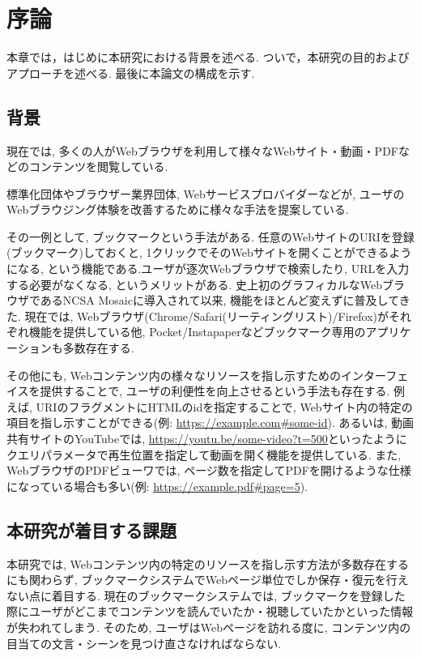 \chapter{序論}
\label{chap:introduction}

本章では，はじめに本研究における背景を述べる.
ついで，本研究の目的およびアプローチを述べる.
最後に本論文の構成を示す.

\section{背景}
\label{section:background}

現在では, 多くの人がWebブラウザを利用して様々なWebサイト・動画・PDFなどのコンテンツを閲覧している.

標準化団体やブラウザー業界団体, Webサービスプロバイダーなどが, ユーザのWebブラウジング体験を改善するために様々な手法を提案している.

その一例として, ブックマークという手法がある.
任意のWebサイトのURIを登録(ブックマーク)しておくと, 1クリックでそのWebサイトを開くことができるようになる, という機能である.ユーザが逐次Webブラウザで検索したり, URLを入力する必要がなくなる, というメリットがある.
史上初のグラフィカルなWebブラウザであるNCSA Mosaic\cite{ncsa-mosaic}に導入されて以来, 機能をほとんど変えずに普及してきた.
現在では, Webブラウザ(Chrome\cite{chrome}/Safari\cite{safari}(リーティングリスト)/Firefox\cite{firefox})がそれぞれ機能を提供している他, Pocket\cite{pocket}/Instapaper\cite{instapaper}などブックマーク専用のアプリケーションも多数存在する.

その他にも, Webコンテンツ内の様々なリソースを指し示すためのインターフェイスを提供することで, ユーザの利便性を向上させるという手法も存在する.
例えば, URIのフラグメントにHTMLのidを指定することで, Webサイト内の特定の項目を指し示すことができる(例: \url{https://example.com#some-id}).
あるいは, 動画共有サイトのYouTube\cite{youtube}では, \url{https://youtu.be/some-video?t=500}といったようにクエリパラメータで再生位置を指定して動画を開く機能を提供している.
また, WebブラウザのPDFビューワでは, ページ数を指定してPDFを開けるような仕様になっている場合も多い\cite{browser-pdf-viewer-pdf-page-num-function}(例: \url{https://example.pdf#page=5}).

\section{本研究が着目する課題}
本研究では, Webコンテンツ内の特定のリソースを指し示す方法が多数存在するにも関わらず, ブックマークシステムでWebページ単位でしか保存・復元を行えない点に着目する.
現在のブックマークシステムでは, ブックマークを登録した際にユーザがどこまでコンテンツを読んでいたか・視聴していたかといった情報が失われてしまう.
そのため, ユーザはWebページを訪れる度に, コンテンツ内の目当ての文言・シーンを見つけ直さなければならない.

